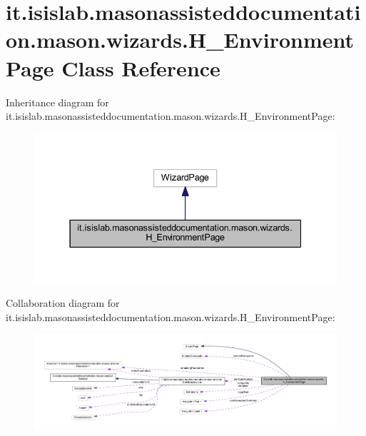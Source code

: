 \hypertarget{classit_1_1isislab_1_1masonassisteddocumentation_1_1mason_1_1wizards_1_1_h___environment_page}{\section{it.\-isislab.\-masonassisteddocumentation.\-mason.\-wizards.\-H\-\_\-\-Environment\-Page Class Reference}
\label{classit_1_1isislab_1_1masonassisteddocumentation_1_1mason_1_1wizards_1_1_h___environment_page}
}


Inheritance diagram for it.\-isislab.\-masonassisteddocumentation.\-mason.\-wizards.\-H\-\_\-\-Environment\-Page\-:
\nopagebreak
\begin{figure}[H]
\begin{center}
\leavevmode
\includegraphics[width=337pt]{classit_1_1isislab_1_1masonassisteddocumentation_1_1mason_1_1wizards_1_1_h___environment_page__inherit__graph}
\end{center}
\end{figure}


Collaboration diagram for it.\-isislab.\-masonassisteddocumentation.\-mason.\-wizards.\-H\-\_\-\-Environment\-Page\-:
\nopagebreak
\begin{figure}[H]
\begin{center}
\leavevmode
\includegraphics[width=350pt]{classit_1_1isislab_1_1masonassisteddocumentation_1_1mason_1_1wizards_1_1_h___environment_page__coll__graph}
\end{center}
\end{figure}
